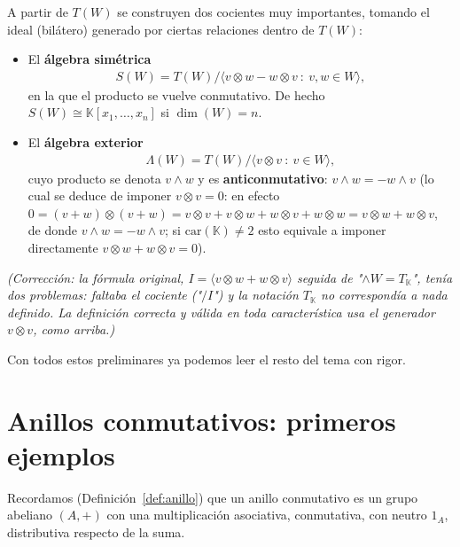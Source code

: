 A partir de $T(W)$ se construyen dos cocientes muy importantes, tomando el ideal (bilátero) generado por ciertas relaciones dentro de $T(W)$:

\begin{itemize}
    \item El \textbf{álgebra simétrica}
    \begin{gather*}
        S(W) = T(W)/\langle v\otimes w - w\otimes v \ :\ v,w\in W\rangle,
    \end{gather*}
    en la que el producto se vuelve conmutativo. De hecho $S(W)\cong \mathbb{K}[x_1,\ldots,x_n]$ si $\dim(W)=n$.
    \item El \textbf{álgebra exterior}
    \begin{gather*}
        \Lambda(W) = T(W)/\langle v\otimes v \ : \ v\in W\rangle,
    \end{gather*}
    cuyo producto se denota $v\wedge w$ y es \textbf{anticonmutativo}: $v\wedge w = -w\wedge v$ (lo cual se deduce de imponer $v\otimes v=0$: en efecto $0=(v+w)\otimes(v+w) = v\otimes v + v\otimes w + w\otimes v + w\otimes w = v\otimes w+w\otimes v$, de donde $v\wedge w=-w\wedge v$; si $\mathrm{car}(\mathbb{K})\neq 2$ esto equivale a imponer directamente $v\otimes w+w\otimes v=0$).
\end{itemize}

\emph{(Corrección: la fórmula original, $I=\langle v\otimes w+w\otimes v\rangle$ seguida de "$\wedge W = T_{\mathbb{K}}$", tenía dos problemas: faltaba el cociente ("$/I$") y la notación $T_{\mathbb{K}}$ no correspondía a nada definido. La definición correcta y válida en toda característica usa el generador $v\otimes v$, como arriba.)}

\bigskip
Con todos estos preliminares ya podemos leer el resto del tema con rigor.

\section{Anillos conmutativos: primeros ejemplos}\label{sec:anillos-conmutativos}

Recordamos (Definición~\ref{def:anillo}) que un anillo conmutativo es un grupo abeliano $(A,+)$ con una multiplicación asociativa, conmutativa, con neutro $1_A$, distributiva respecto de la suma.

